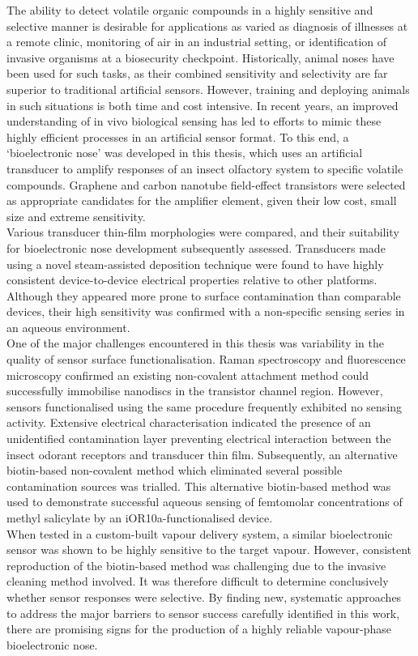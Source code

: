 The ability to detect volatile organic compounds in a highly sensitive and selective manner is desirable for applications as varied as diagnosis of illnesses at a remote clinic, monitoring of air in an industrial setting, or identification of invasive organisms at a biosecurity checkpoint. Historically, animal noses have been used for such tasks, as their combined sensitivity and selectivity are far superior to traditional artificial sensors. However, training and deploying animals in such situations is both time and cost intensive. In recent years, an improved understanding of in vivo biological sensing has led to efforts to mimic these highly efficient processes in an artificial sensor format. To this end, a ‘bioelectronic nose’ was developed in this thesis, which uses an artificial transducer to amplify responses of an insect olfactory system to specific volatile compounds. Graphene and carbon nanotube field-effect transistors were selected as appropriate candidates for the amplifier element, given their low cost, small size and extreme sensitivity. \\[5pt] Various transducer thin-film morphologies were compared, and their suitability for bioelectronic nose development subsequently assessed. Transducers made using a novel steam-assisted deposition technique were found to have highly consistent device-to-device electrical properties relative to other platforms. Although they appeared more prone to surface contamination than comparable devices, their high sensitivity was confirmed with a non-specific sensing series in an aqueous environment. \\[5pt] One of the major challenges encountered in this thesis was variability in the quality of sensor surface functionalisation. Raman spectroscopy and fluorescence microscopy confirmed an existing non-covalent attachment method could successfully immobilise nanodiscs in the transistor channel region. However, sensors functionalised using the same procedure frequently exhibited no sensing activity. Extensive electrical characterisation indicated the presence of an unidentified contamination layer preventing electrical interaction between the insect odorant receptors and transducer thin film. Subsequently, an alternative biotin-based non-covalent method which eliminated several possible contamination sources was trialled. This alternative biotin-based method was used to demonstrate successful aqueous sensing of femtomolar concentrations of methyl salicylate by an iOR10a-functionalised device. \\[5pt] When tested in a custom-built vapour delivery system, a similar bioelectronic sensor was shown to be highly sensitive to the target vapour. However, consistent reproduction of the biotin-based method was challenging due to the invasive cleaning method involved. It was therefore difficult to determine conclusively whether sensor responses were selective. By finding new, systematic approaches to address the major barriers to sensor success carefully identified in this work, there are promising signs for the production of a highly reliable vapour-phase bioelectronic nose.

